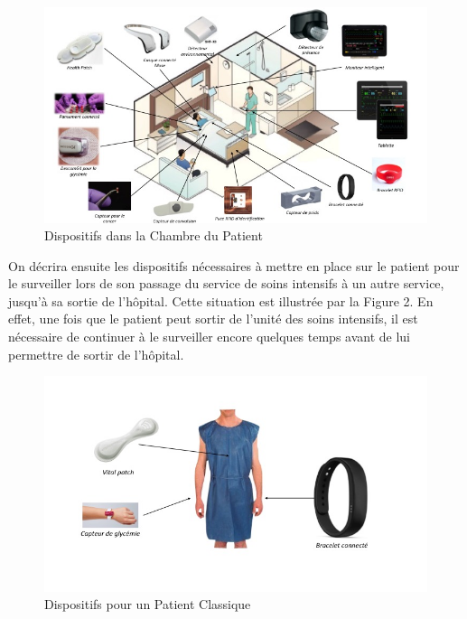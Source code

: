 \documentclass{article}
\begin{document}
\begin{figure}[h!]
	\hspace*{-3cm}
	\centering
	\includegraphics[width=1.5\textwidth]{Figure1.jpg}
	\caption{Dispositifs dans la Chambre du Patient}
	\label{fig:balance}
\end{figure}

On décrira ensuite les dispositifs nécessaires à mettre en place sur le patient pour le surveiller lors de son passage du service de soins intensifs à un autre service, jusqu’à sa sortie de l’hôpital. Cette situation est illustrée par la Figure 2. En effet, une fois que le patient peut sortir de l'unité des soins intensifs, il est nécessaire de continuer à le surveiller encore quelques temps avant de lui permettre de sortir de l’hôpital.
\\
\begin{figure}[h!]
	\hspace*{-1cm}
	\centering
	\includegraphics[width=1.2\textwidth]{Figure2.jpg}
	\caption{Dispositifs pour un Patient Classique}
	\label{fig:balance}
\end{figure}
\end{document}

